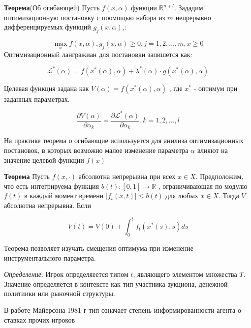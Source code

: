 
\textbf{Теорема}(Об огибающей) Пусть $f(x,\alpha)$  функции $\mathbb{R}^{n+l}$. Зададим оптимизационную постановку с поомощью набора из $m$ непрерывно дифференцируемых функций $g_j(x,\alpha)$,:

$$
    \max_{x} f(x,\alpha), g_j(x,\alpha) \ge 0, j=1,2,\dots,m, x\ge 0
$$
Оптимизационный лангражиан для постановки запишется как:

$$
    \mathcal{L}^*(\alpha)=f(x^*(\alpha),\alpha) +\lambda^*(\alpha) \cdot g(x^*(\alpha),\alpha)
$$

Целевая функция задана как $V(\alpha)=f(x^*(\alpha),\alpha)$ , где $x^*$ - оптимум при заданных параметрах.

$$
    \frac{\partial V(\alpha)}{\partial \alpha_k} = \frac{\partial \mathcal{L}^*(\alpha)}{\partial \alpha_k}, k=1,2,\dots,l
$$

На практике теорема о огибающие используется для анилиза оптимизационных постановок, в которых возможно малое изменение параметра $\alpha$ влияют на значение целевой функции $f(x)$

\textbf{Теорема} Пусть $f(x,\cdot)$ абсолютна непрерывна при всех $x \in X$. Предположим, что есть интегрируема функция $b(t):[0,1] \rightarrow \mathbb{R}$ , ограничивающая по модулю $f(t)$ в каждый момент времени $|f_t(x,t)| \le b(t)$ для любых $x\in X$. Тогда $V$ абсолютна непрерывна. Если 

$$
    V(t) = V(0) + \int_0^t f_t(x^*(s),s) ds
$$

Теорема позволяет изучать смещения оптимума при изменение инструментального параметра.


\textit{Определение}. Игрок определяеется типом $t$, являющего элементом множества $T$. Значение определяется в контексте как тип участника аукциона, денежной политиики или рыночной структуры.

В работе Майерсона 1981 г \cite{myerson1983mechanism} тип означает степень информированности агента о ставках прочих игроков 




